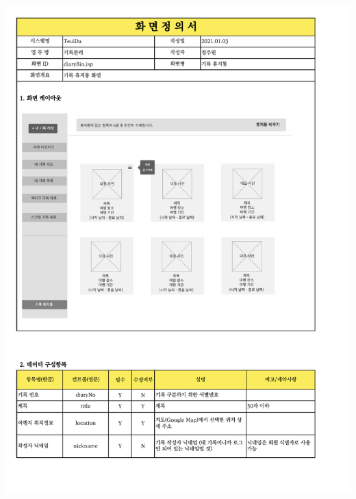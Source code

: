 {{{{{{{{{{{{{{{{{{\includegraphics[width=20cm]{./Figure/Analysis/Display/diary/diary_17.pdf} \\
}}}}}}}}}}}}}}}}}}
